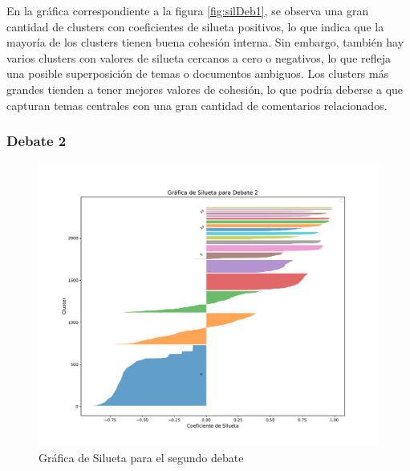 \documentclass[10pt, a4paper]{article}
\begin{document}
	En la gráfica correspondiente a la figura \ref{fig:silDeb1}, se observa una gran cantidad de clusters con coeficientes de silueta positivos, lo que indica que la mayoría de los clusters tienen buena cohesión interna. Sin embargo, también hay varios clusters con valores de silueta cercanos a cero o negativos, lo que refleja una posible superposición de temas o documentos ambiguos. Los clusters más grandes tienden a tener mejores valores de cohesión, lo que podría deberse a que capturan temas centrales con una gran cantidad de comentarios relacionados.
	
	\subsubsection{Debate 2}

	\begin{figure}[h!]
		\centering
		\begin{minipage}{0.49\textwidth} %
			\includegraphics[width=\linewidth]{silhouette_debate2.pdf} 
			\caption{Gráfica de Silueta para el segundo debate}
			\label{fig:silDeb2}
		\end{minipage}
		\hfill %
		\begin{minipage}{0.49\textwidth}

\end{minipage}
\end{figure}
\end{document}
